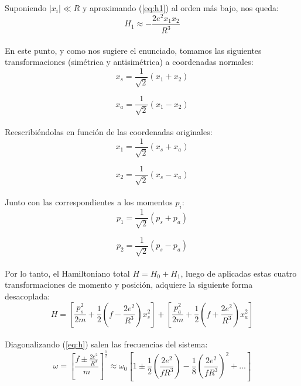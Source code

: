 \documentclass[a4paper]{article}
\begin{document}
Suponiendo $|x_{i}| \ll R$ y aproximando (\ref{eq:h1}) al orden m\'as bajo, nos queda:\\

\begin{equation}
\label{eq:h11}
H_{1} \approx -\frac{2e^{2}x_{1}x_{2}}{R^{3}}
\end{equation}
\\
En este punto, y como nos sugiere el enunciado, tomamos las siguientes transformaciones (sim\'etrica y antisim\'etrica) a coordenadas normales:\\

$$ x_{s} = \frac{1}{\sqrt{2}}(x_{1} + x_{2})$$

$$ x_{a} = \frac{1}{\sqrt{2}}(x_{1} - x_{2})$$
\\
Reescribi\'endolas en funci\'on de las coordenadas originales:\\

$$ x_{1} = \frac{1}{\sqrt{2}}(x_{s} + x_{a})$$

$$ x_{2} = \frac{1}{\sqrt{2}}(x_{s} - x_{a})$$
\\
Junto con las correspondientes a los momentos $p_{i}$:\\

$$ p_{1} = \frac{1}{\sqrt{2}}(p_{s} + p_{a})$$

$$ p_{2} = \frac{1}{\sqrt{2}}(p_{s} - p_{a})$$
\\
Por lo tanto, el Hamiltoniano total $H = H_{0} + H_{1}$, luego de aplicadas estas cuatro transformaciones de momento y posici\'on, adquiere la siguiente forma desacoplada:\\

\begin{equation}
\label{eq:h}
H = \left[ \frac{p_{s}^{2}}{2m} + \frac{1}{2} \left( f - \frac{2e^{2}}{R^{3}}\right)x_{s}^{2} \right] + \left[ \frac{p_{a}^{2}}{2m} + \frac{1}{2} \left( f + \frac{2e^{2}}{R^{3}}\right)x_{a}^{2} \right]
\end{equation}
\\

Diagonalizando (\ref{eq:h}) salen las frecuencias del sistema:\\

\begin{equation}
\label{eq:omegas}
\omega = \left[ \frac{f \pm \frac{2e^{2}}{R^{3}}}{m} \right]^{\frac{1}{2}} \approx \omega_{0}\left[ 1 \pm \frac{1}{2}\left( \frac{2e^{2}}{fR^{3}}\right) - \frac{1}{8}\left( \frac{2e^{2}}{fR^{3}} \right)^{2} + ...\right]
\end{equation}
\end{document}
